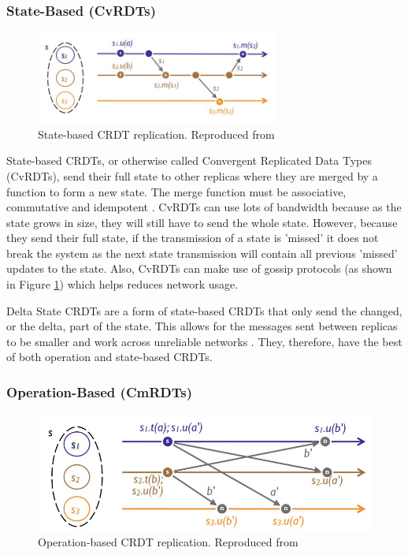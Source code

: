 \documentclass[12pt]{article}
\begin{document}
\subsubsection{State-Based (CvRDTs)}

\begin{figure}
    \centering
    \includegraphics[width=8cm]{state.jpg}
    \caption{State-based CRDT replication. Reproduced from \cite{10.1007/978-3-642-24550-3_29}}
    \label{fig:statebased}
\end{figure}

State-based CRDTs, or otherwise called Convergent Replicated Data Types (CvRDTs), send their full state to other replicas where they are merged by a function to form a new state. The merge function must be associative, commutative and idempotent \cite{10.1007/978-3-642-24550-3_29}. CvRDTs can use lots of bandwidth because as the state grows in size, they will still have to send the whole state. However, because they send their full state, if the transmission of a state is 'missed' it does not break the system as the next state transmission will contain all previous 'missed' updates to the state. Also, CvRDTs can make use of gossip protocols (as shown in Figure \ref{fig:statebased}) which helps reduces network usage. \par

Delta State CRDTs are a form of state-based CRDTs that only send the changed, or the delta, part of the state. This allows for the messages sent between replicas to be smaller and work across unreliable networks \cite{Almeida_2018}. They, therefore, have the best of both operation and state-based CRDTs.


\subsubsection{Operation-Based (CmRDTs)}

\begin{figure}
    \centering
    \includegraphics[width=8 cm]{operation.jpg}
    \caption{Operation-based CRDT replication. Reproduced from \cite{10.1007/978-3-642-24550-3_29}}
    \label{fig:operation}
\end{figure}
\end{document}
